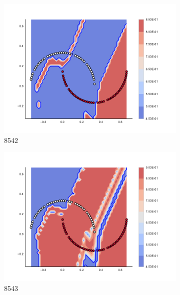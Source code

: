 \begin{figure}[h]
\begin{subfigure}[b]{0.09\textwidth}
    \includegraphics[clip, trim=2.35cm 1.75cm 4.5cm 0cm,width=\textwidth]{img/convergence/8542.pdf}
    \caption{8542}
    \label{fig:convergence_8542}
\end{subfigure}
%
\begin{subfigure}[b]{0.09\textwidth}
    \includegraphics[clip, trim=2.35cm 1.75cm 4.5cm 0cm,width=\textwidth]{img/convergence/8543.pdf}
    \caption{8543}
    \label{fig:convergence_8543}
\end{subfigure}
%
\begin{subfigure}[b]{0.09\textwidth}

\end{subfigure}
\end{figure}
